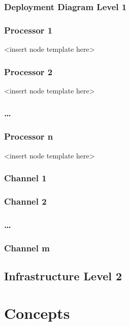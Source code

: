 \documentclass[]{article}
\begin{document}
\subsubsection{Deployment Diagram Level 1}

\subsubsection{Processor 1}

\textless{}insert node template here\textgreater{}

\subsubsection{Processor 2}

\textless{}insert node template here\textgreater{}

\subsubsection{\ldots{}}

\subsubsection{Processor n}

\textless{}insert node template here\textgreater{}

\subsubsection{Channel 1}

\subsubsection{Channel 2}

\subsubsection{\ldots{}}

\subsubsection{Channel m}

\subsection{Infrastructure Level 2}

\section{Concepts}
\end{document}
